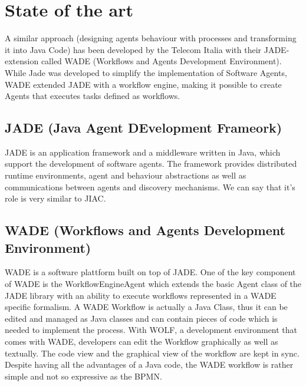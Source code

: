 \chapter{State of the art}

A similar approach (designing agents behaviour with processes and transforming it into Java Code) has been developed by the Telecom Italia with their JADE-extension called WADE (Workflows and Agents Development Environment). While Jade was developed to simplify the implementation of Software Agents, WADE extended JADE with a workflow engine, making it possible to create Agents that executes tasks defined as workflows.

\section{JADE (\textbf{J}ava \textbf{A}gent \textbf{DE}velopment Frameork)}
JADE is an application framework and a middleware written in Java, which support the development of software agents. The framework  provides distributed runtime environments, agent and behaviour abstractions as well as communications between agents and discovery mechanisms. We can say that it's role is very similar to JIAC.

\section{WADE (Workflows and Agents Development Environment)}
WADE \cite{16,10,12} is a software plattform built on top of JADE. One of the key component of WADE is the WorkflowEngineAgent which extends the basic Agent class of the JADE library with an ability to execute workflows represented in a WADE specific formalism.
A WADE Workflow is actually a Java Class, thus it can be edited and managed as Java classes and can contain pieces of code which is needed to implement the process. With WOLF, a development environment that comes with WADE, developers can edit the Workflow graphically as well as textually. The code view and the graphical view of the workflow are kept in sync. 
Despite having all the advantages of a Java code, the WADE workflow is rather simple and not so expressive as the BPMN.